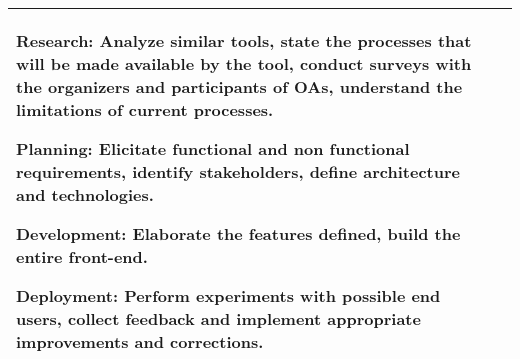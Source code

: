 \begin{table}[!htb]
\begin{tabular}{l|p{11cm}}
    \begin{inparaenum}[(i)]
      \item Research: Analyze similar tools, state the processes that will be made available by the tool, conduct surveys with the organizers and participants of \acp{OA}, understand the limitations of current processes.
      \item Planning: Elicitate functional and non functional requirements, identify stakeholders, define architecture and technologies.
      \item Development: Elaborate the features defined, build the entire front-end.
      \item Deployment: Perform experiments with possible end users, collect feedback and implement appropriate improvements and corrections.
    \end{inparaenum}                                                                                                          \\
    \toprule
  \end{tabular}
\end{table}
